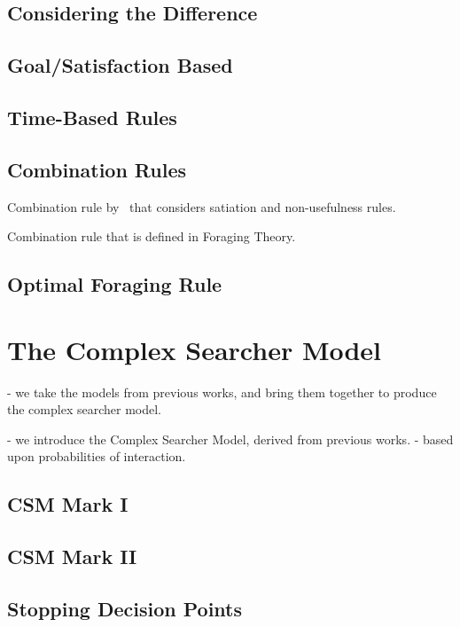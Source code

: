 \subsection{Considering the Difference}

\subsection{Goal/Satisfaction Based}

\subsection{Time-Based Rules}

\subsection{Combination Rules}

Combination rule by~\citealt{kraft1979stopping_rules} that considers satiation and non-usefulness rules.

Combination rule that is defined in Foraging Theory.

\subsection{Optimal Foraging Rule}

\section{The Complex Searcher Model}\label{sec:proposal:csm}

- we take the models from previous works, and bring them together to produce the complex searcher model.

- we introduce the Complex Searcher Model, derived from previous works.
- based upon probabilities of interaction.

\subsection{CSM Mark I}

\subsection{CSM Mark II}

\subsection{Stopping Decision Points}

